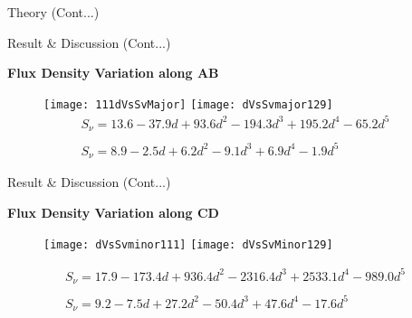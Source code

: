 \documentclass[12pt,a4paper]{beamer}
\begin{document}
\begin{frame}{Theory (Cont...)}
\begin{frame}{Result \& Discussion (Cont...)}
\begin{block}{\centering\textbf{Flux Density Variation along AB \vspace*{.05cm}}}
\begin{itemize}
\begin{figure}[h]
\vspace{0.0cm} \centering
\texttt{[image: 111dVsSvMajor]}
\texttt{[image: dVsSvmajor129]}
\begin{equation*}\label{LB}
\begin{array}{l}
S_{\nu} = 13.6 - 37.9d + 93.6d^{2} - 194.3d^{3} + 195.2d^{4} - 65.2d^{5}
\\
\\
S_{\nu} = 8.9 - 2.5d + 6.2d^2 - 9.1d^{3} + 6.9d^{4} - 1.9d^{5}
\end{array}
\end{equation*}

\end{figure}
\end{itemize}
\end{block}
\end{frame}

\begin{frame}{Result \& Discussion (Cont...)}
\begin{block}{\centering\textbf{Flux Density Variation along CD \vspace*{.05cm}}}
\begin{itemize}
\begin{figure}[h]
\vspace{0.0cm} \centering
\texttt{[image: dVsSvminor111]}
\texttt{[image: dVsSvMinor129]}
\end{figure}
\begin{equation*}\label{LB}
\begin{array}{l}
S_{\nu} = 17.9 - 173.4d + 936.4d^{2} - 2316.4d^{3} + 2533.1d^{4} - 989.0d^{5}
\\
\\
S_{\nu} = 9.2 - 7.5d + 27.2d^{2} - 50.4d^{3} + 47.6d^{4} - 17.6d^{5}
\end{array}
\end{equation*}
\end{itemize}
\end{block}
\end{frame}


\end{frame}
\end{document}
